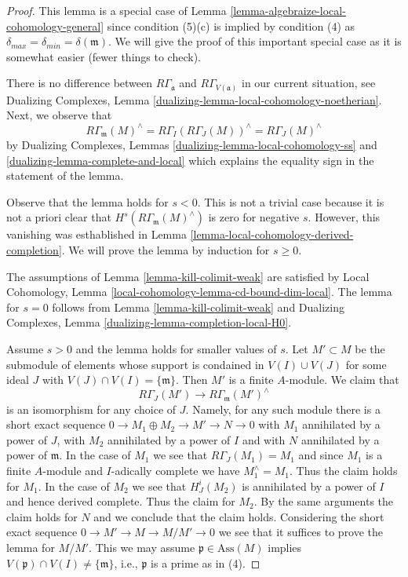 \begin{proof}
This lemma is a special case of
Lemma \ref{lemma-algebraize-local-cohomology-general}
since condition (5)(c) is implied by condition (4)
as $\delta_{max} = \delta_{min} = \delta(\mathfrak m)$.
We will give the proof of this important special case
as it is somewhat easier (fewer things to check).

\medskip\noindent
There is no difference between $R\Gamma_\mathfrak a$ and
$R\Gamma_{V(\mathfrak a)}$ in our current situation, see
Dualizing Complexes, Lemma \ref{dualizing-lemma-local-cohomology-noetherian}.
Next, we observe that
$$
R\Gamma_\mathfrak m(M)^\wedge =
R\Gamma_I(R\Gamma_J(M))^\wedge =
R\Gamma_J(M)^\wedge
$$
by Dualizing Complexes, Lemmas \ref{dualizing-lemma-local-cohomology-ss} and
\ref{dualizing-lemma-complete-and-local}
which explains the equality sign in the statement of the lemma.

\medskip\noindent
Observe that the lemma holds for $s < 0$. This is not a trivial case because
it is not a priori clear that $H^s(R\Gamma_\mathfrak m(M)^\wedge)$
is zero for negative $s$. However, this vanishing was esthablished
in Lemma \ref{lemma-local-cohomology-derived-completion}.
We will prove the lemma by induction for $s \geq 0$.

\medskip\noindent
The assumptions of Lemma \ref{lemma-kill-colimit-weak}
are satisfied by Local Cohomology, Lemma
\ref{local-cohomology-lemma-cd-bound-dim-local}.
The lemma for $s = 0$ follows from Lemma \ref{lemma-kill-colimit-weak} and
Dualizing Complexes, Lemma \ref{dualizing-lemma-completion-local-H0}.

\medskip\noindent
Assume $s > 0$ and the lemma holds for smaller values of $s$.
Let $M' \subset M$ be the submodule of elements whose
support is condained in $V(I) \cup V(J)$ for some
ideal $J$ with $V(J) \cap V(I) = \{\mathfrak m\}$.
Then $M'$ is a finite $A$-module.
We claim that
$$
R\Gamma_J(M') \to R\Gamma_\mathfrak m(M')^\wedge
$$
is an isomorphism for any choice of $J$.
Namely, for any such module there is a short exact sequence
$0 \to M_1 \oplus M_2 \to M' \to N \to 0$ with
$M_1$ annihilated by a power of $J$, with $M_2$ annihilated
by a power of $I$ and with $N$ annihilated by a power of $\mathfrak m$.
In the case of $M_1$ we see that $R\Gamma_J(M_1) = M_1$ and
since $M_1$ is a finite $A$-module and $I$-adically complete
we have $M_1^\wedge = M_1$. Thus the claim holds for $M_1$.
In the case of $M_2$ we see that $H^i_J(M_2)$ is annihilated
by a power of $I$ and hence derived complete. Thus the claim
for $M_2$. By the same arguments the claim holds for $N$
and we conclude that the claim holds. Considering the
short exact sequence $0 \to M' \to M \to M/M' \to 0$
we see that it suffices to prove the lemma for $M/M'$.
This we may assume $\mathfrak p \in \text{Ass}(M)$
implies $V(\mathfrak p) \cap V(I) \not = \{\mathfrak m\}$, i.e.,
$\mathfrak p$ is a prime as in (4).


\end{proof}
